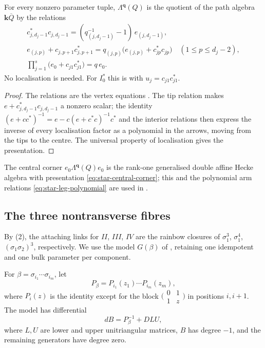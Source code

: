 \documentclass[a4paper]{amsart}
\newcommand{\kk}{\mathbf{k}}
\numberwithin{equation}{section}
\begin{document}
\begin{proposition}\label{prop:star-algebra}
For every nonzero parameter tuple, $\Lambda^{\boldsymbol q}(Q)$ is the
quotient of the path algebra $\kk\overline Q$ by the relations
\[
\begin{gathered}
 c_{j,d_j-1}^*c_{j,d_j-1}=(q_{(j,d_j-1)}^{-1}-1)\,e_{(j,d_j-1)},\\
 e_{(j,p)}+c_{j,p+1}c_{j,p+1}^*
 =q_{(j,p)}\bigl(e_{(j,p)}+c_{jp}^*c_{jp}\bigr)\quad(1\le p\le d_j-2),\\
 \prod_{j=1}^{s}\bigl(e_0+c_{j1}c_{j1}^*\bigr)=q\,e_0 .
\end{gathered}
\]
No localisation is needed. For $I_0^*$ this is
 with $u_j=c_{j1}c_{j1}^*$.
\end{proposition}

\begin{proof}
The relations are the vertex equations .
The tip relation makes
$e+c_{j,d_j-1}^*c_{j,d_j-1}$ a nonzero scalar; the identity
$(e+cc^*)^{-1}=e-c(e+c^*c)^{-1}c^*$ and the interior relations then
express the inverse of every localisation factor as a polynomial in the
arrows, moving from the tips to the centre. The universal property of
localisation gives the presentation.
\end{proof}

The central corner $e_0\Lambda^{\boldsymbol q}(Q)e_0$ is the rank-one
generalised double affine Hecke algebra with presentation
\eqref{eq:star-central-corner};
this and the polynomial arm relations
\eqref{eq:star-leg-polynomial} are used in .

\subsection{The three nontransverse fibres}
\label{subsec:nontransverse}

By (2), the attaching links for
$II$, $III$, $IV$ are the rainbow closures of $\sigma_1^3$,
$\sigma_1^4$, $(\sigma_1\sigma_2)^3$, respectively. We use the model
$G(\beta)$ of \cite[Definition~2.2 and Lemma~2.3]{CSrainbow},
retaining one idempotent and one bulk parameter per component.

For $\beta=\sigma_{i_1}\cdots\sigma_{i_m}$, let
\[
 P_\beta=P_{i_1}(z_1)\cdots P_{i_m}(z_m),
\]
where $P_i(z)$ is the identity except for the block
$\bigl(\begin{smallmatrix}0&1\\1&z\end{smallmatrix}\bigr)$
in positions $i,i+1$. The model has differential
\begin{equation}\label{eq:rainbow-differential}
 dB=P_\beta^{-1}+DLU,
\end{equation}
where $L,U$ are lower and upper unitriangular matrices, $B$ has degree
$-1$, and the remaining generators have degree zero.
\end{document}
